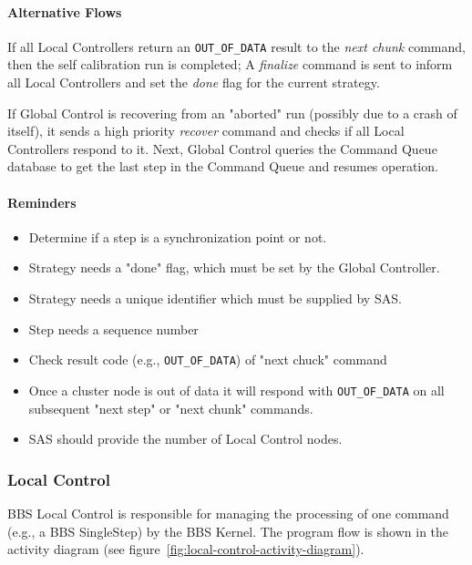 \documentclass[10pt]{lofar}
\begin{document}
\paragraph*{Alternative Flows}
If all Local Controllers return an \texttt{OUT\_OF\_DATA} result to the
\textit{next chunk} command, then the self calibration run is completed; A
\textit{finalize} command is sent to inform all Local Controllers and set the
\textit{done} flag for the current strategy.

If Global Control is recovering from an "aborted" run (possibly due to a crash
of itself), it sends a high priority \textit{recover} command and checks if
all Local Controllers respond to it. Next, Global Control queries the Command
Queue database to get the last step in the Command Queue and resumes
operation.

\paragraph*{Reminders} 
\begin{itemize}
\item Determine if a step is a synchronization point or not.
\item Strategy needs a "done" flag, which must be set by the Global Controller.
\item Strategy needs a unique identifier which must be supplied by SAS.
\item Step needs a sequence number
\item Check result code (e.g., \texttt{OUT\_OF\_DATA}) of "next chuck" command
\item Once a cluster node is out of data it will respond with
\texttt{OUT\_OF\_DATA} on all subsequent "next step" or "next chunk" commands.
\item SAS should provide the number of Local Control nodes.
\end{itemize}

\subsubsection{Local Control}
\label{subsubsec:design-local-control}
BBS Local Control is responsible for managing the processing of one command
(e.g., a BBS SingleStep) by the BBS Kernel. The program flow is shown in the
activity diagram (see figure~\ref{fig:local-control-activity-diagram}).
\end{document}
